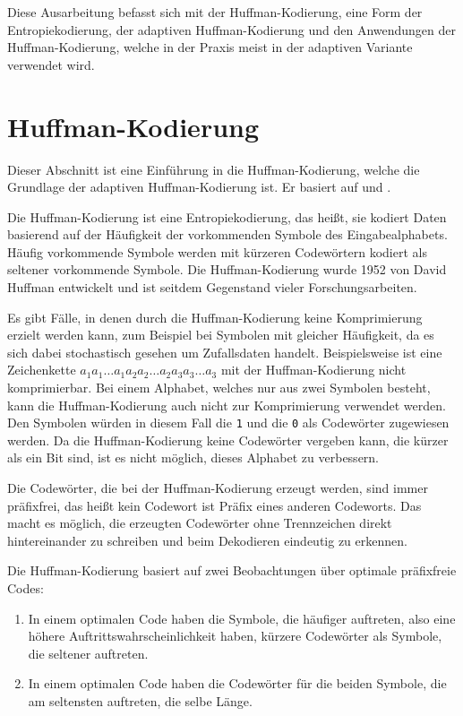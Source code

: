 \documentclass[twoside,11pt,a4paper]{article}
\theoremstyle{break}
\begin{document}
Diese Ausarbeitung befasst sich mit der Huffman-Kodierung, eine Form
der Entropiekodierung, der adaptiven Huffman-Kodierung und den
Anwendungen der Huffman-Kodierung, welche in der Praxis meist in der
adaptiven Variante verwendet wird.

\section{Huffman-Kodierung} \label{sec:huffman}
Dieser Abschnitt ist eine Einführung in die Huffman-Kodierung, welche
die Grundlage der adaptiven Huffman-Kodierung ist. Er basiert auf \cite[S. 211 -- 221]{Salomon:2010} und \cite[S. 41 --
  45]{Sayood:2006}.

Die Huffman-Kodierung ist eine Entropiekodierung, das heißt, sie
kodiert Daten basierend auf der Häufigkeit der vorkommenden Symbole
des Eingabealphabets. Häufig vorkommende Symbole werden mit kürzeren
Codewörtern kodiert als seltener vorkommende Symbole. Die
Huffman-Kodierung wurde 1952 von David Huffman entwickelt und ist
seitdem Gegenstand vieler Forschungsarbeiten.

Es gibt Fälle, in denen durch die Huffman-Kodierung keine
Komprimierung erzielt werden kann, zum Beispiel bei Symbolen mit
gleicher Häufigkeit, da es sich dabei stochastisch gesehen um
Zufallsdaten handelt. Beispielsweise ist eine Zeichenkette
$a_1a_1{\dots}a_1a_2a_2{\dots}a_2a_3a_3\allowbreak{\dots}a_3$ mit der
Huffman-Kodierung nicht komprimierbar. Bei einem Alphabet, welches nur
aus zwei Symbolen besteht, kann die Huffman-Kodierung auch nicht zur
Komprimierung verwendet werden. Den Symbolen würden in diesem Fall
die {\tt1} und die {\tt0} als Codewörter zugewiesen werden.
Da die Huffman-Kodierung keine Codewörter vergeben kann, die kürzer
als ein Bit sind, ist es nicht möglich, dieses Alphabet zu verbessern.

Die Codewörter, die bei der Huffman-Kodierung erzeugt werden, sind
immer präfixfrei, das heißt kein Codewort ist Präfix eines anderen
Codeworts. Das macht es möglich, die erzeugten Codewörter ohne
Trennzeichen direkt hintereinander zu schreiben und beim Dekodieren
eindeutig zu erkennen.

Die Huffman-Kodierung basiert auf zwei Beobachtungen über optimale
präfixfreie Codes:

\begin{enumerate}
\item In einem optimalen Code haben die Symbole, die häufiger
  auftreten, also eine höhere Auftrittswahrscheinlichkeit haben,
  kürzere Codewörter als Symbole, die seltener auftreten.
\item In einem optimalen Code haben die Codewörter für die beiden
  Symbole, die am seltensten auftreten, die selbe Länge.
\end{enumerate}
\end{document}
